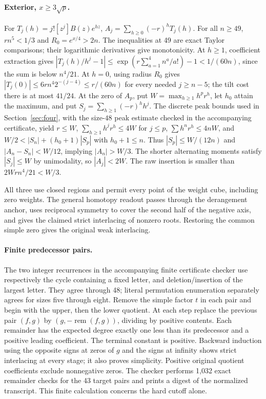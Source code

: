 \paragraph{Exterior, \(x\ge3\sqrt p\).} For \(T_j(h)=j![z^j]B(z)e^{hz}\), \(A_j=\sum_{h\ge0}(-r)^hT_j(h)\). For all \(n\ge49\), \(r n^5<1/3\) and \(R_0=e^{x/4}>2n\). The inequalities at 49 are exact Taylor comparisons; their logarithmic derivatives give monotonicity. At \(h\ge1\), coefficient extraction gives \(|T_j(h)/h^j-1|\le\exp(r\sum_{a=1}^4 n^a/a!)-1<1/(60n)\), since the sum is below \(n^4/21\). At \(h=0\), using radius \(R_0\) gives \(|T_j(0)|\le6r n^4 2^{-(j-4)}\le r/(60n)\) for every needed \(j\ge n-5\); the tilt cost there is at most \(41/24\). At the zero of \(A_p\), put \(W=\max_{h\ge1}h^pr^h\), let \(h_0\) attain the maximum, and put \(S_j=\sum_{h\ge1}(-r)^h h^j\). The discrete peak bounds used in Section~\ref{sec:four}, with the size-$48$ peak estimate checked in the accompanying certificate, yield \(r\le W\), \(\sum_{h\ge1}h^jr^h\le4W\) for \(j\le p\), \(\sum h^nr^h\le4nW\), and \(W/2<|S_n|+(h_0+1)|S_p|\) with \(h_0+1\le n\). Thus \(|S_p|\le W/(12n)\) and \(|A_n-S_n|<W/12\), implying \(|A_n|>W/3\). The shorter alternating moments satisfy \(|S_j|\le W\) by unimodality, so \(|A_j|<2W\). The raw insertion is smaller than \(2Wr n^4/21<W/3\).

All three use closed regions and permit every point of the weight cube, including zero weights. The general homotopy readout passes through the derangement anchor, uses reciprocal symmetry to cover the second half of the negative axis, and gives the claimed strict interlacing of nonzero roots. Restoring the common simple zero gives the original weak interlacing.


\paragraph{Finite predecessor pairs.}\label{five-signed-remainder}
The two integer recurrences in the accompanying finite certificate checker use respectively the cycle containing a fixed letter, and deletion/insertion of the largest letter. They agree through 48; literal permutation enumeration separately agrees for sizes five through eight. Remove the simple factor \(t\) in each pair and begin with the upper, then the lower quotient. At each step replace the previous pair \((f,g)\) by \((g,-\operatorname{rem}(f,g))\), dividing by positive contents. Each remainder has the expected degree exactly one less than its predecessor and a positive leading coefficient. The terminal constant is positive. Backward induction using the opposite signs at zeros of \(g\) and the signs at infinity shows strict interlacing at every stage; it also proves simplicity. Positive original quotient coefficients exclude nonnegative zeros. The checker performs 1,032 exact remainder checks for the 43 target pairs and prints a digest of the normalized transcript.  This finite calculation concerns the hard cutoff alone.
